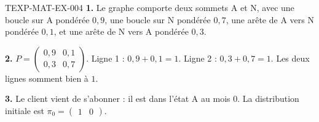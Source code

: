 \begin{corrige}{TEXP-MAT-EX-004}
\textbf{1.} Le graphe comporte deux sommets A et N, avec une boucle sur A pondérée $0{,}9$, une boucle sur N pondérée $0{,}7$, une arête de A vers N pondérée $0{,}1$, et une arête de N vers A pondérée $0{,}3$.

\textbf{2.} $P=\begin{pmatrix}0{,}9&0{,}1\\0{,}3&0{,}7\end{pmatrix}$. Ligne 1 : $0{,}9+0{,}1=1$. Ligne 2 : $0{,}3+0{,}7=1$. Les deux lignes somment bien à $1$.

\textbf{3.} Le client vient de s'abonner : il est dans l'état A au mois $0$. La distribution initiale est $\pi_0=\begin{pmatrix}1&0\end{pmatrix}$.
\end{corrige}
